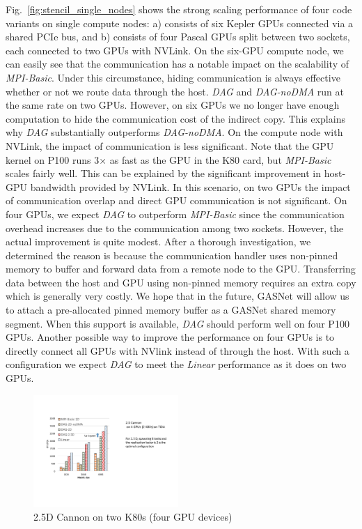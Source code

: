 Fig.~\ref{fig:stencil_single_nodes} shows the strong scaling performance of four code variants on single compute nodes: a) consists of six Kepler GPUs connected via a shared PCIe bus, and b) consists of four Pascal GPUs split between two sockets, each connected to two GPUs with NVLink.
On the six-GPU compute node, we can easily see that the communication has a notable impact on the scalability of {\em MPI-Basic}.
Under this circumstance, hiding communication is always effective whether or not we route data through the host.
{\em DAG} and {\em DAG-noDMA} run at the same rate on two GPUs.
However, on six GPUs we no longer have enough computation to hide the communication cost of the indirect copy.
This explains why {\em DAG} substantially outperforms {\em DAG-noDMA}.
On the compute node with NVLink, the impact of communication is less significant.
Note that the GPU kernel on P100 runs 3$\times$ as fast as the GPU in the K80 card, but {\em MPI-Basic} scales fairly well.
This can be explained by the significant improvement in host-GPU bandwidth provided by NVLink.
In this scenario, on two GPUs the impact of communication overlap and direct GPU communication is not significant.
On four GPUs, we expect {\em DAG} to outperform {\em MPI-Basic} since the communication overhead increases due to the communication among two sockets.
However, the actual improvement is quite modest.
After a thorough investigation, we determined the reason is because the communication handler uses non-pinned memory to buffer and forward data from a remote node to the GPU.
Transferring data between the host and GPU using non-pinned memory requires an extra copy which is generally very costly.
We hope that in the future, GASNet will allow us to attach a pre-allocated pinned memory buffer as a GASNet shared memory segment.
When this support is available, {\em DAG} should perform well on four P100 GPUs.
Another possible way to improve the performance on four GPUs is to directly connect all GPUs with NVlink instead of through the host.
With such a configuration we expect {\em DAG} to meet the {\em Linear} performance as it does on two GPUs.




\begin{figure}[htb]
\centering
\includegraphics[width=0.49\textwidth]{figures/cannon_tida.pdf}
\caption{2.5D Cannon on two K80s (four GPU devices)}
\label{cannon_onnode}
\end{figure}



